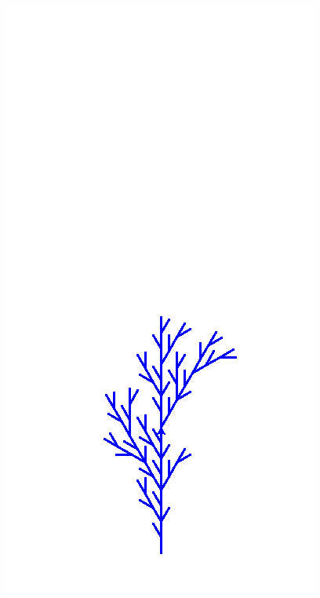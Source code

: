 \documentclass[11pt,class=report,crop=false]{standalone}
\begin{document}
\begin{center}
\includegraphics[scale=\myscale,scale=0.25]{figures/plante-01-3}

\end{center}
\end{document}
